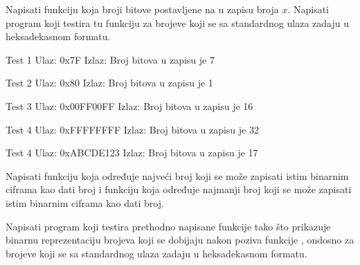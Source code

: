 \begin{Exercise}[label=004]
\begin{Exercise}[label=202]
 Napisati funkciju koja broji bitove postavljene na  u zapisu broja $x$. Napisati program koji testira tu funkciju za brojeve koji se sa standardnog ulaza zadaju u heksadekasnom formatu.

\begin{minitest}
\begin{test}{Test 1}
Ulaz:   0x7F  
Izlaz:  
  Broj bitova u zapisu je  7   
\end{test}
\end{minitest}
\begin{minitest}
\begin{test}{Test 2}
Ulaz:   0x80
Izlaz:  
  Broj bitova u zapisu je 1
\end{test}
\end{minitest}
\begin{minitest}
\begin{test}{Test 3}
Ulaz:   0x00FF00FF
Izlaz:  
  Broj bitova u zapisu je 16
\end{test}
\end{minitest}

\begin{minitest}
\begin{test}{Test 4}
Ulaz:   0xFFFFFFFF
Izlaz:  
  Broj bitova u zapisu je 32
\end{test}
\end{minitest}
\begin{minitest}
\begin{test}{Test 4}
Ulaz:   0xABCDE123
Izlaz:  
  Broj bitova u zapisu je 17
\end{test}
\end{minitest}

\end{Exercise}
\begin{Answer}[ref=202]
\end{Answer}


\begin{Exercise}[label=203]
Napisati funkciju  koja određuje najveći broj koji se može zapisati istim binarnim ciframa kao dati broj i funkciju  koja određuje najmanji broj koji se može zapisati istim binarnim ciframa kao dati broj.

Napisati program koji testira prethodno napisane funkcije tako što prikazuje binarnu reprezentaciju brojeva koji se dobijaju nakon poziva funkcije , ondosno  za brojeve koji se sa standardnog ulaza zadaju u heksadekasnom formatu. 


\end{Exercise}
\end{Exercise}
